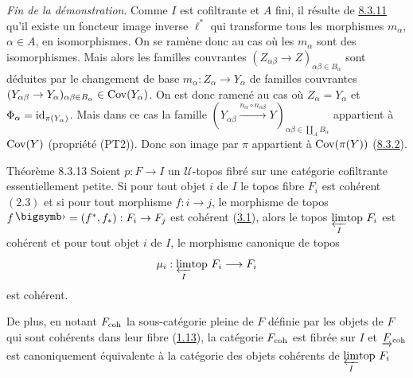 \documentclass[10pt]{../fichiers-configuration-latex/smfart}
\begin{document}
\setcounter{subsubsection}{11}
\subsubsection{}
\emph{Fin de la démonstration}. Comme $I$ est cofiltrante et $A$
fini, il résulte de \hyperref[VI.lem8.3.11]{8.3.11} qu'il existe un foncteur
image inverse $\ell^{\ast}$  qui transforme tous les morphismes
$m_{\alpha}$, $\alpha \in A$, en isomorphismes. On se ramène donc au
cas où les $m_{\alpha}$ sont des isomorphismes. Mais alors les
familles couvrantes $(Z_{\alpha \beta} \to Z)_{\alpha \beta \in
B_{\alpha}}$ sont déduites par le changement de base $m_{\alpha} :
Z_\alpha \to Y_{\alpha}$ de familles couvrantes $(Y_{\alpha \beta}
\to Y_{\alpha})_{\alpha \beta \in B_{\alpha}} \in \Cov(Y_{\alpha})$.
On est donc ramené au cas où $Z_\alpha = Y_{\alpha}$ et
$\Phi_{\alpha} = \operatorname{id}_{\pi(Y_{\alpha})}$. Mais dans ce cas la famille
$(Y_{\alpha\beta} \xrightarrow{n_{\alpha} \circ n_{\alpha
    \beta}} Y)_{\alpha \beta \in \mathop{\coprod}_A B_{\alpha}}$
appartient à $\operatorname{Cov}(Y)$ (propriété (PT2)). Donc son image par $\pi$
appartient à $\operatorname{Cov}(\pi(Y))$ (\hyperref[VI.subsubsec8.3.2]{8.3.2}).

\begin{enonce*}{Théorème 8.3.13}
Soient $p : F \to I$ un $𝒰$-topos fibré sur une catégorie cofiltrante
essentiellement petite. Si pour tout objet $i$ de $I$ le topos fibre
$F_i$ est cohérent $(\hyperref[VI.def2.3]{2.3})$ et si pour tout morphisme $f : i \to j$, le
morphisme de topos $f\bigdot = (f^{\ast}, f_{\ast}) : F_i \to F_j$ est
cohérent (\hyperref[VI.def3.1]{3.1}), alors le topos ${\displaystyle{\varprojlim_{I}\!\mbox{\rm top }}} F_i$
est cohérent et pour tout objet $i$ de $I$, le morphisme canonique de
topos
$$
\mu_i : \limtop{I} F_i \to F_i
$$
est cohérent.

De plus, en notant $F_{\mathrm{coh}}$ la sous-catégorie pleine de $F$ définie
par les objets de $F$ qui sont cohérents dans leur fibre (\hyperref[VI.def1.13]{1.13}), la
catégorie $F_{\mathrm{coh}}$ est fibrée sur $I$ et $\underrightarrow{F}_{\mathrm{coh}}$ est
canoniquement équivalente à la catégorie des objets cohérents de
${\displaystyle{\varprojlim_{I}\!\mbox{\rm top }}} F_i$
\end{enonce*}
\end{document}

